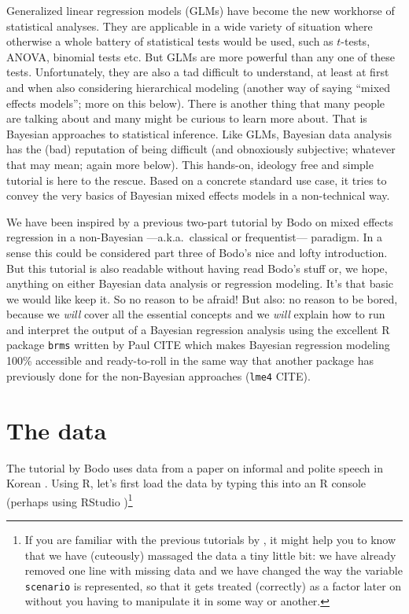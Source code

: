 \documentclass[fleqn,reqno,12pt]{article}
\begin{document}
Generalized linear regression models (GLMs) have become the new workhorse of statistical analyses. They are applicable in a wide variety of situation where otherwise a whole battery of statistical tests would be used, such as $t$-tests, ANOVA, binomial tests etc. But GLMs are more powerful than any one of these tests.  Unfortunately, they are also a tad difficult to understand, at least at first and when also considering hierarchical modeling (another way of saying ``mixed effects models''; more on this below). There is another thing that many people are talking about and many might be curious to learn more about. That is Bayesian approaches to statistical inference. Like GLMs, Bayesian data analysis has the (bad) reputation of being difficult (and obnoxiously subjective; whatever that may mean; again more below). This hands-on, ideology free and simple tutorial is here to the rescue. Based on a concrete standard use case, it tries to convey the very basics of Bayesian mixed effects models in a non-technical way.


We have been inspired by a previous two-part tutorial by Bodo \citet{Winter2013:Linear-models-a} on mixed effects regression in a non-Bayesian ---a.k.a.~classical or frequentist--- paradigm. In a sense this could be considered part three of Bodo's nice and lofty introduction. But this tutorial is also readable without having read Bodo's stuff or, we hope, anything on either Bayesian data analysis or regression modeling. It's that basic we would like keep it. So no reason to be afraid! But also: no reason to be bored, because we \emph{will} cover all the essential concepts and we \emph{will} explain how to run and interpret the output of a Bayesian regression analysis using the excellent R package \texttt{brms} written by Paul CITE which makes Bayesian regression modeling 100\% accessible and ready-to-roll in the same way that another package has previously done for the non-Bayesian approaches (\texttt{lme4} CITE). 

\section{The data}

The tutorial by Bodo \citet{Winter2013:Linear-models-a} uses data from a paper on informal and polite speech in Korean \citep{WinterGrawunder2012:The-Phonetic-Pr}. Using R, let's first load the data by typing this into an R console (perhaps using RStudio )\footnote{If you are familiar with the previous tutorials by \citet{Winter2013:Linear-models-a}, it might help you to know that we have (cuteously) massaged the data a tiny little bit: we have already removed one line with missing data and we have changed the way the variable \texttt{scenario} is represented, so that it gets treated (correctly) as a factor later on without you having to manipulate it in some way or another.}
\end{document}
